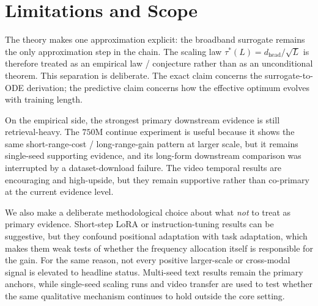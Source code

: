 \section{Limitations and Scope}

The theory makes one approximation explicit: the broadband surrogate remains the only approximation step in the chain. The scaling law \(\tau^*(L)=d_{\mathrm{head}}/\sqrt{L}\) is therefore treated as an empirical law / conjecture rather than as an unconditional theorem. This separation is deliberate. The exact claim concerns the surrogate-to-ODE derivation; the predictive claim concerns how the effective optimum evolves with training length.

On the empirical side, the strongest primary downstream evidence is still retrieval-heavy. The \(750\mathrm{M}\) continue experiment is useful because it shows the same short-range-cost / long-range-gain pattern at larger scale, but it remains single-seed supporting evidence, and its long-form downstream comparison was interrupted by a dataset-download failure. The video temporal results are encouraging and high-upside, but they remain supportive rather than co-primary at the current evidence level.

We also make a deliberate methodological choice about what \emph{not} to treat as primary evidence. Short-step LoRA or instruction-tuning results can be suggestive, but they confound positional adaptation with task adaptation, which makes them weak tests of whether the frequency allocation itself is responsible for the gain. For the same reason, not every positive larger-scale or cross-modal signal is elevated to headline status. Multi-seed text results remain the primary anchors, while single-seed scaling runs and video transfer are used to test whether the same qualitative mechanism continues to hold outside the core setting.
